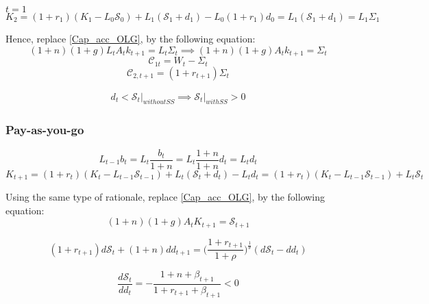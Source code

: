 $t=1$
\begin{equation*}
    K_{2}=(1+r_{1})(K_{1}-L_{0}\mathcal{S}_{0})+L_{1}(\mathcal{S}_{1}+d_{1})-L_{0}(1+r_{1})d_{0}=L_{1}(\mathcal{S}_{1}+d_{1})=L_{1}\Sigma_{1}
\end{equation*}

Hence, replace \ref{Cap_acc_OLG}, by the following equation:
\begin{equation*}
    (1+n)(1+g)L_{t}A_{t}k_{t+1}=L_{t}\Sigma_{t} \implies (1+n)(1+g)A_{t}k_{t+1}=\Sigma_{t}
\end{equation*}
\begin{equation*}
    \mathcal{C}_{1t}=W_{t}-\Sigma_{t}
\end{equation*}
\begin{equation*}
    \mathcal{C}_{2,t+1}=(1+r_{t+1})\Sigma_{t}
\end{equation*}

\begin{equation*}
    \begin{aligned}
        d_{t}<\mathcal{S}_{t}\bigg \rvert_{without SS} \implies \mathcal{S}_{t}\bigg\rvert_{with SS}>0
    \end{aligned}
\end{equation*}

\subsubsection{Pay-as-you-go}
\begin{equation*}
    L_{t-1}b_{t}=L_{t}\frac{b_{t}}{1+n}=L_{t}\frac{1+n}{1+n}d_{t}=L_{t}d_{t}
\end{equation*}
\begin{equation*}
    K_{t+1}=(1+r_{t})(K_{t}-L_{t-1}\mathcal{S}_{t-1})+L_{t}(\mathcal{S}_{t}+d_{t})-L_{t}d_{t}=(1+r_{t})(K_{t}-L_{t-1}\mathcal{S}_{t-1})+L_{t}\mathcal{S}_{t}
\end{equation*}

Using the same type of rationale, replace \ref{Cap_acc_OLG}, by the following equation: 
\begin{equation*}
    (1+n)(1+g)A_{t}K_{t+1}=\mathcal{S}_{t+1}
\end{equation*}

\begin{equation*}
    (1+r_{t+1})d\mathcal{S}_{t}+(1+n)dd_{t+1}=\bigg(\frac{1+r_{t+1}}{1+\rho}\bigg)^{\frac{1}{\theta}}(d\mathcal{S}_{t}-dd_{t})
\end{equation*}

\begin{equation*}
    \frac{d\mathcal{S}_{t}}{d d_{t}}=-\frac{1+n+\beta_{t+1}}{1+r_{t+1}+\beta_{t+1}}<0
\end{equation*}

